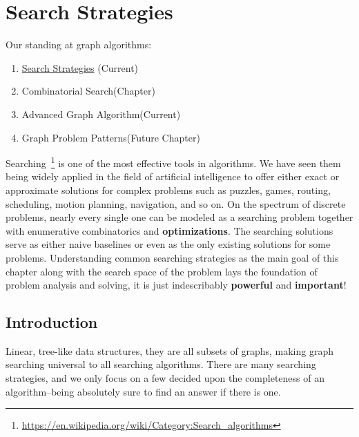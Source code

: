 \documentclass[../main.tex]{subfiles}
\begin{document}
\chapter{Search Strategies}
Our standing at graph algorithms:
\begin{enumerate}
    \item \underline{Search Strategies} (Current)
    \item Combinatorial Search(Chapter)
    \item Advanced  Graph Algorithm(Current)
    \item Graph Problem Patterns(Future Chapter)
\end{enumerate}

Searching~\footnote{\url{https://en.wikipedia.org/wiki/Category:Search_algorithms}} is one of the most effective tools in algorithms. We  have seen them being widely applied in the field of artificial intelligence  to offer either exact or approximate solutions for complex problems such as puzzles, games, routing, scheduling, motion planning, navigation, and so on. 
On the spectrum of discrete problems, nearly every single one can be modeled as a searching problem together with enumerative combinatorics and \textbf{optimizations}. 
The searching solutions  serve as either naive baselines or even as the only existing solutions for some problems. 
Understanding common searching strategies as the main goal of this chapter along with  the search space of the problem lays the foundation of problem analysis and solving, it is just indescribably \textbf{powerful} and \textbf{important}! 

\section{Introduction}
\label{section_linear_search}

Linear, tree-like data structures, they are all subsets of graphs, making graph searching universal to all searching algorithms. There are many searching strategies, and we only focus on a few decided upon the completeness of an algorithm--being absolutely sure to find an answer if there is one. 
\end{document}
